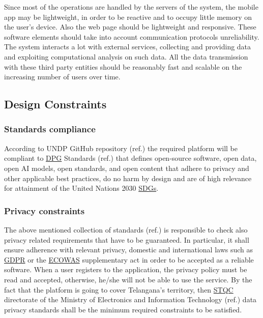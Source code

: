 Since most of the operations are handled by the servers of the system, the mobile app may be lightweight, in order to be reactive and to occupy little memory on the user’s device. Also the web page should be lightweight and responsive. These software elements should take into account communication protocols unreliability.
\newline
\newline
The system interacts a lot with external services, collecting and providing data and exploiting computational analysis on such data. All the data transmission with these third party entities should be reasonably fast and scalable on the increasing number of users over time.


\subsection{Design Constraints}

\subsubsection{Standards compliance}

According to UNDP GitHub repository (ref.\cite{UNDP_GitHub}) the required platform will be compliant to \hyperref[tab:acronymsTable]{DPG} Standards (ref.\cite{DPGS}) that defines open-source software, open data, open AI models, open standards, and open content that adhere to privacy and other applicable best practices, do no harm by design and are of high relevance for attainment of the United Nations 2030 \hyperref[tab:acronymsTable]{SDGs}.

\subsubsection{Privacy constraints}
The above mentioned collection of standards (ref.\cite{DPGS}) is responsible to check also privacy related requirements that have to be guaranteed. In particular, it shall ensure adherence with relevant privacy, domestic and international laws such as \hyperref[tab:acronymsTable]{GDPR} or the \hyperref[tab:acronymsTable]{ECOWAS} supplementary act  in order to be accepted as a reliable software. When a user registers to the application, the privacy policy must be read and accepted, otherwise, he/she will not be able to use the service. By the fact that the platform is going to cover Telangana's territory, then \hyperref[tab:acronymsTable]{STQC} directorate of the Ministry of Electronics and Information Technology (ref.\cite{DPGS}) data privacy standards shall be the minimum required constraints to be satisfied.




